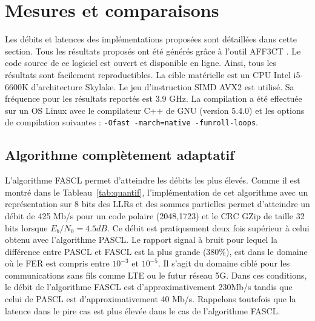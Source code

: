\section{Mesures et comparaisons}
\label{sec:exp_scl}

Les débits et latences des implémentations proposées sont détaillées dans cette section. Tous les résultats proposés ont été générés grâce à l'outil AFF3CT \cite{aff3ct_aff3ct:_2016}. Le code source de ce logiciel est ouvert et disponible en ligne. Ainsi, tous les résultats sont facilement reproductibles. La cible matérielle est un CPU Intel i5-6600K d'architecture Skylake. Le jeu d'instruction SIMD AVX2 est utilisé. Sa fréquence pour les résultats reportés est 3.9 GHz. La compilation a été effectuée sur un OS Linux avec le compilateur C++ de GNU (version 5.4.0) et les options de compilation suivantes : \texttt{-Ofast -march=native -funroll-loops}.

\subsection{Algorithme complètement adaptatif}
L'algorithme FASCL permet d'atteindre les débits les plus élevés. Comme il est montré dans le Tableau~\ref{tab:quantif}, l'implémentation de cet algorithme avec un représentation sur 8 bits des LLRs et des sommes partielles permet d'atteindre un débit de 425 Mb/s pour un code polaire (2048,1723) et le CRC GZip de taille 32 bits lorsque $E_b/N_0=4.5dB$. Ce débit est pratiquement deux fois supérieur à celui obtenu avec l'algorithme PASCL. Le rapport signal à bruit pour lequel la différence entre PASCL et FASCL est la plus grande (380\%), est dans le domaine où le FER est compris entre $10^{-3}$ et $10^{-5}$. Il s'agit du domaine ciblé pour les communications sans fils comme LTE ou le futur réseau 5G. Dans ces conditions, le débit de l'algorithme FASCL est d'approximativement 230Mb/s tandis que celui de PASCL est d'approximativement 40 Mb/s. Rappelons toutefois que la latence dans le pire cas est plus élevée dans le cas de l'algorithme FASCL.

